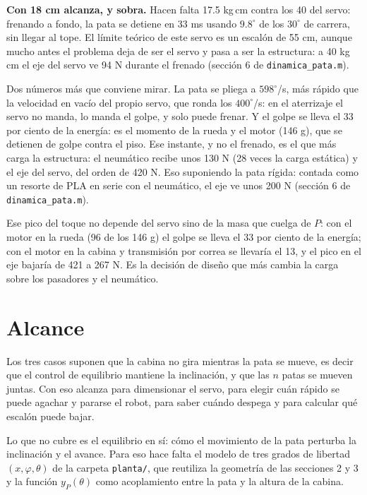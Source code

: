 \documentclass[11pt,a4paper]{article}
\begin{document}
\textbf{Con 18 cm alcanza, y sobra.} Hacen falta 17.5 kg\,cm contra los 40 del servo: frenando a fondo, la pata
se detiene en 33 ms usando \(9.8^\circ\) de los \(30^\circ\) de carrera, sin llegar al tope. El límite teórico de este
servo es un escalón de 55 cm, aunque mucho antes el problema deja de ser el servo y pasa a ser la estructura:
a 40 kg\,cm el eje del servo ve 94 N durante el frenado (sección 6 de \texttt{dinamica\_pata.m}).

Dos números más que conviene mirar. La pata se pliega a \(598^\circ\)/s, más rápido que la velocidad en vacío
del propio servo, que ronda los \(400^\circ\)/s: en el aterrizaje el servo no manda, lo manda el golpe, y solo
puede frenar. Y el golpe se lleva el 33 por ciento de la energía: es el momento de la rueda y el motor (146 g), que
se detienen de golpe contra el piso. Ese instante, y no el frenado, es el que más carga la estructura: el
neumático recibe unos 130 N (28 veces la carga estática) y el eje del servo, del orden de 420 N. Eso suponiendo
la pata rígida: contada como un resorte de PLA en serie con el neumático, el eje ve unos 200 N (sección 6 de
\texttt{dinamica\_pata.m}).

Ese pico del toque no depende del servo sino de la masa que cuelga de \(P\): con el motor en la rueda (96 de
los 146 g) el golpe se lleva el 33 por ciento de la energía; con el motor en la cabina y transmisión por correa se
llevaría el 13, y el pico en el eje bajaría de 421 a 267 N. Es la decisión de diseño que más cambia la carga sobre los pasadores y el neumático.

\section{Alcance}

Los tres casos suponen que la cabina no gira mientras la pata se mueve, es decir que el control de equilibrio
mantiene la inclinación, y que las \(n\) patas se mueven juntas. Con eso alcanza para dimensionar el servo,
para elegir cuán rápido se puede agachar y pararse el robot, para saber cuándo despega y para calcular
qué escalón puede bajar.

Lo que no cubre es el equilibrio en sí: cómo el movimiento de la pata perturba la inclinación y el avance.
Para eso hace falta el modelo de tres grados de libertad \((x,\varphi,\theta)\) de la carpeta
\texttt{planta/}, que reutiliza la geometría de las secciones 2 y 3 y la función \(y_P(\theta)\) como
acoplamiento entre la pata y la altura de la cabina.
\end{document}
